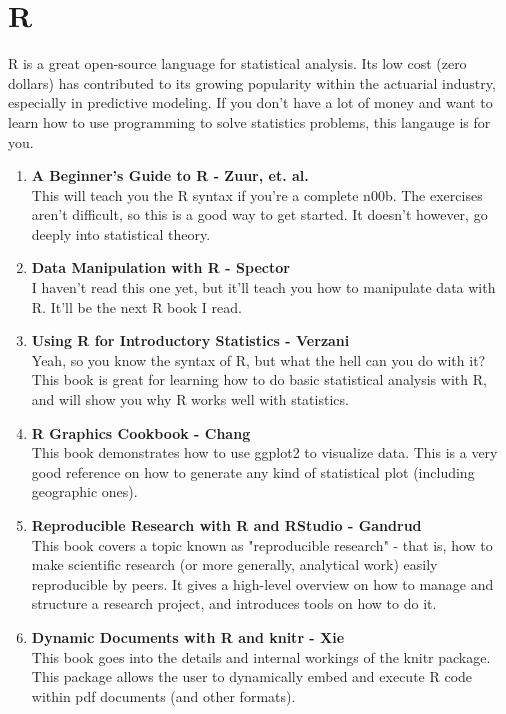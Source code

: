 \documentclass[oneside, titlepage]{article}
\begin{document}
\section{R}
R is a great open-source language for statistical analysis. Its low cost (zero dollars) has contributed to its growing popularity within the actuarial industry, especially in predictive modeling. If you don't have a lot of money and want to learn how to use programming to solve statistics problems, this langauge is for you.

\begin{enumerate}
\item{\bfseries A Beginner's Guide to R - Zuur, et. al.}\\
This will teach you the R syntax if you're a complete n00b. The exercises aren't difficult, so this is a good way to get started. It doesn't however, go deeply into statistical theory.

\item{\bfseries Data Manipulation with R - Spector}\\
I haven't read this one yet, but it'll teach you how to manipulate data with R. It'll be the next R book I read.

\item{\bfseries Using R for Introductory Statistics - Verzani}\\
Yeah, so you know the syntax of R, but what the hell can you do with it? This book is great for learning how to do basic statistical analysis with R, and will show you why R works well with statistics.

\item{\bfseries R Graphics Cookbook - Chang}\\
This book demonstrates how to use ggplot2 to visualize data. This is a very good reference on how to generate any kind of statistical plot (including geographic ones).

\item{\bfseries Reproducible Research with R and RStudio - Gandrud}\\
This book covers a topic known as "reproducible research" - that is, how to make scientific research (or more generally, analytical work) easily reproducible by peers. It gives a high-level overview on how to manage and structure a research project, and introduces tools on how to do it.

\item{\bfseries Dynamic Documents with R and knitr - Xie}\\
This book goes into the details and internal workings of the knitr package. This package allows the user to dynamically embed and execute R code within pdf documents (and other formats).

\end{enumerate}
\end{document}
